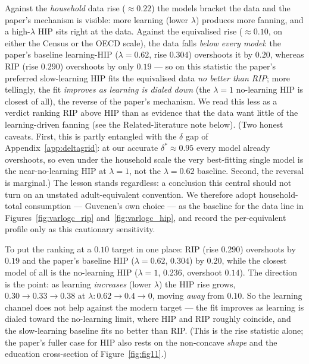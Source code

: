 \documentclass[11pt,fleqn]{article}
\begin{document}
\noindent Against the \emph{household} data rise ($\approx0.22$) the models bracket the
data and the paper's mechanism is visible: more learning (lower $\lambda$) produces more
fanning, and a high-$\lambda$ HIP sits right at the data. Against the equivalised rise
($\approx0.10$, on either the Census or the OECD scale), the data falls \emph{below every
model}: the paper's baseline
learning-HIP ($\lambda=0.62$, rise $0.304$) overshoots it by $0.20$, whereas RIP (rise
$0.290$) overshoots by only $0.19$ --- so on this statistic the paper's preferred
slow-learning HIP fits the equivalised data \emph{no better than RIP}; more tellingly, the
fit \emph{improves as learning is dialed down} (the $\lambda=1$ no-learning HIP is closest
of all), the reverse of the paper's mechanism. We read this less as a verdict ranking RIP
above HIP than as evidence that the data want little of the learning-driven fanning (see the
Related-literature note below). (Two honest caveats. First, this is partly entangled
with the $\delta$ gap of Appendix~\ref{app:deltagrid}: at our accurate $\delta^*\approx0.95$
every model already overshoots, so even under the household scale the very best-fitting
single model is the near-no-learning HIP at $\lambda=1$, not the $\lambda=0.62$ baseline.
Second, the reversal is marginal.) The lesson stands regardless: a conclusion this central
should not turn on an unstated adult-equivalent convention. We therefore adopt
household-total consumption --- Guvenen's own choice --- as the baseline for the data line
in Figures~\ref{fig:varlogc_rip} and~\ref{fig:varlogc_hip}, and record the per-equivalent
profile only as this cautionary sensitivity.

To put the ranking at a $0.10$ target in one place: RIP (rise $0.290$) overshoots by $0.19$
and the paper's baseline HIP ($\lambda=0.62$, $0.304$) by $0.20$, while the closest model of
all is the no-learning HIP ($\lambda=1$, $0.236$, overshoot $0.14$). The direction is the
point: as learning \emph{increases} (lower $\lambda$) the HIP rise grows,
$0.30\to0.33\to0.38$ at $\lambda:0.62\to0.4\to0$, moving \emph{away} from $0.10$. So the
learning channel does not help against the modern target --- the fit improves as learning is
dialed toward the no-learning limit, where HIP and RIP roughly coincide, and the
slow-learning baseline fits no better than RIP. (This is the rise statistic alone; the
paper's fuller case for HIP also rests on the non-concave \emph{shape} and the education
cross-section of Figure~\ref{fig:fig11}.)
\end{document}
